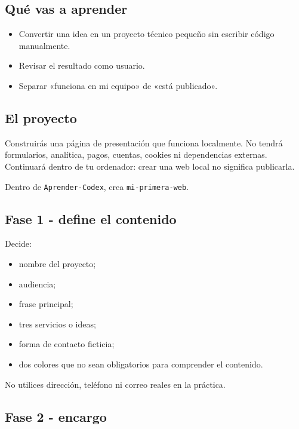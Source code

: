 \documentclass[10pt,a4paper,openany]{book}
\providecommand{\tightlist}{\setlength{\itemsep}{0.18em}\setlength{\parskip}{0pt}}
\begin{document}
\subsection{Qué vas a aprender}\label{quuxe9-vas-a-aprender-10}

\begin{itemize}
\tightlist
\item
  Convertir una idea en un proyecto técnico pequeño sin escribir código
  manualmente.
\item
  Revisar el resultado como usuario.
\item
  Separar «funciona en mi equipo» de «está publicado».
\end{itemize}

\subsection{El proyecto}\label{el-proyecto}

Construirás una página de presentación que funciona localmente. No
tendrá formularios, analítica, pagos, cuentas, cookies ni dependencias
externas. Continuará dentro de tu ordenador: crear una web local no
significa publicarla.

Dentro de \texttt{Aprender-Codex}, crea \texttt{mi-primera-web}.

\subsection{Fase 1 - define el
contenido}\label{fase-1---define-el-contenido}

Decide:

\begin{itemize}
\tightlist
\item
  nombre del proyecto;
\item
  audiencia;
\item
  frase principal;
\item
  tres servicios o ideas;
\item
  forma de contacto ficticia;
\item
  dos colores que no sean obligatorios para comprender el contenido.
\end{itemize}

No utilices dirección, teléfono ni correo reales en la práctica.

\subsection{Fase 2 - encargo}\label{fase-2---encargo}
\end{document}
